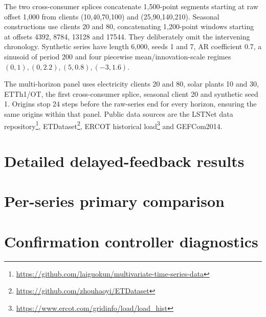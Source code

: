 \documentclass[preprint,11pt]{elsarticle}
\begin{document}
The two cross-consumer splices concatenate 1,500-point segments starting at raw offset
1,000 from clients (10,40,70,100) and (25,90,140,210). Seasonal constructions use clients
20 and 80, concatenating 1,200-point windows starting at offsets 4392, 8784, 13128 and
17544. They deliberately omit the intervening chronology. Synthetic series have length
6,000, seeds 1 and 7, AR coefficient 0.7, a sinusoid of period 200 and four piecewise
mean/innovation-scale regimes $(0,1),(0,2.2),(5,0.8),(-3,1.6)$.

The multi-horizon panel uses electricity clients 20 and 80, solar plants 10 and 30,
ETTh1/OT, the first cross-consumer splice, seasonal client 20 and synthetic seed 1.
Origins stop 24 steps before the raw-series end for every horizon, ensuring the same
origins within that panel. Public data sources are the LSTNet data repository\footnote{\url{https://github.com/laiguokun/multivariate-time-series-data}},
ETDataset\footnote{\url{https://github.com/zhouhaoyi/ETDataset}}, ERCOT historical
load\footnote{\url{https://www.ercot.com/gridinfo/load/load_hist}} and GEFCom2014.

\clearpage
\section{Detailed delayed-feedback results}
\begin{table}[h!]\centering\small
\caption{Multi-horizon comparison. Gains use the residual--ACI score at the same horizon.
Local error is in percentage points. Tuning never uses test labels.}
\label{tab:horizon}
\end{table}

\clearpage
\section{Per-series primary comparison}
\begin{table}[h!]\centering\small
\caption{Default CQR--ACI compared with default residual--ACI, averaged over four backbones.}

\end{table}

\clearpage
\section{Confirmation controller diagnostics}\label{app:confirmation}
\begin{table}[htbp]\centering\scriptsize
\caption{Confirmation contrasts at $h=24$. Each row contains four series and two models.
Gain and median are paired interval-score improvements (\%); A is the first method in
the comparison and B the second. Coverage is in percent, target 90\%. Correlated pairs
are retained without interpreting the win count as independent replications.}
\label{tab:confirmation}
\end{table}
\end{document}
